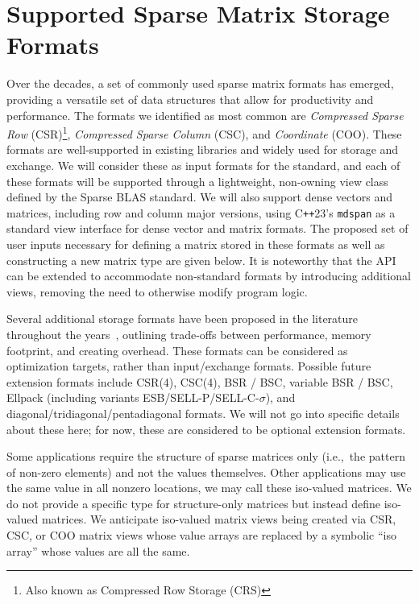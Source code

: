 \documentclass{article}
\newcommand{\cppstd}[1]{C\texttt{++}#1\xspace}
\begin{document}
\section{Supported Sparse Matrix Storage Formats}
\label{sec:sparse-formats}

Over the decades, a set of commonly used sparse matrix formats has emerged, providing a versatile set of data structures that allow for productivity and performance. The formats we identified as most common are \textit{Compressed Sparse Row} (CSR)\footnote{Also known as Compressed Row Storage (CRS)}, \textit{Compressed Sparse Column} (CSC), and \textit{Coordinate} (COO).
These formats are well-supported in existing libraries and widely used
for storage and exchange. We will consider these as input formats for
the standard, and each of these formats will be supported through a lightweight, non-owning view class defined by the Sparse BLAS standard. We will also support dense vectors and matrices, including row and column major versions, using \cppstd{23}'s \texttt{mdspan} as a standard view interface for dense vector and matrix formats. The proposed set of user inputs necessary for defining a matrix stored in these formats as well as constructing a new matrix type are given below. It is noteworthy that the API can be extended to accommodate non-standard formats by introducing additional views, removing the need to otherwise modify program logic.


Several additional storage formats have been proposed in the literature throughout the years~\cite{langr2015evaluation}, outlining trade-offs between performance, memory footprint, and creating overhead. These formats can be considered as optimization targets, rather than input/exchange formats. 
Possible future extension formats include CSR(4), CSC(4), BSR / BSC, variable BSR / BSC, Ellpack (including variants ESB/SELL-P/SELL-C-$\sigma$), and diagonal/tridiagonal/pentadiagonal formats. We will not go into specific details about these here; for now, these are considered to be optional extension formats.

Some applications require the structure of sparse matrices only (i.e.,~the pattern of non-zero elements) and not the values themselves. Other applications may use the same value in all nonzero locations, we may call these iso-valued matrices. We do not provide a specific type for structure-only matrices but instead define iso-valued matrices.  We anticipate iso-valued matrix views being created via CSR, CSC, or COO matrix views whose value arrays are replaced by a symbolic ``iso array'' whose values are all the same.
\end{document}
